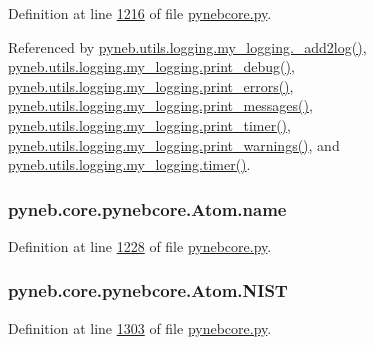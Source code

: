 Definition at line \hyperlink{pynebcore_8py_source_l01216}{1216} of file \hyperlink{pynebcore_8py_source}{pynebcore.\-py}.



Referenced by \hyperlink{logging_8py_source_l00059}{pyneb.\-utils.\-logging.\-my\-\_\-logging.\-\_\-add2log()}, \hyperlink{logging_8py_source_l00157}{pyneb.\-utils.\-logging.\-my\-\_\-logging.\-print\-\_\-debug()}, \hyperlink{logging_8py_source_l00149}{pyneb.\-utils.\-logging.\-my\-\_\-logging.\-print\-\_\-errors()}, \hyperlink{logging_8py_source_l00133}{pyneb.\-utils.\-logging.\-my\-\_\-logging.\-print\-\_\-messages()}, \hyperlink{logging_8py_source_l00165}{pyneb.\-utils.\-logging.\-my\-\_\-logging.\-print\-\_\-timer()}, \hyperlink{logging_8py_source_l00141}{pyneb.\-utils.\-logging.\-my\-\_\-logging.\-print\-\_\-warnings()}, and \hyperlink{logging_8py_source_l00115}{pyneb.\-utils.\-logging.\-my\-\_\-logging.\-timer()}.

\hypertarget{classpyneb_1_1core_1_1pynebcore_1_1_atom_aa8b43e1441b80824954f2f2fac4f2eba}{
\subsubsection[{name}]{\setlength{\rightskip}{0pt plus 5cm}pyneb.\-core.\-pynebcore.\-Atom.\-name}}\label{classpyneb_1_1core_1_1pynebcore_1_1_atom_aa8b43e1441b80824954f2f2fac4f2eba}


Definition at line \hyperlink{pynebcore_8py_source_l01228}{1228} of file \hyperlink{pynebcore_8py_source}{pynebcore.\-py}.

\hypertarget{classpyneb_1_1core_1_1pynebcore_1_1_atom_a65e03e79fb1cde1b00580042f3303538}{
\subsubsection[{N\-I\-S\-T}]{\setlength{\rightskip}{0pt plus 5cm}pyneb.\-core.\-pynebcore.\-Atom.\-N\-I\-S\-T}}\label{classpyneb_1_1core_1_1pynebcore_1_1_atom_a65e03e79fb1cde1b00580042f3303538}


Definition at line \hyperlink{pynebcore_8py_source_l01303}{1303} of file \hyperlink{pynebcore_8py_source}{pynebcore.\-py}.




